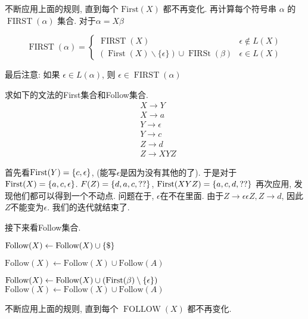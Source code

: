 \documentclass{ctexart}
\newcommand\first{\text{First}}
\newcommand\follow{\text{Follow}}
\begin{document}
    不断应用上面的规则, 直到每个 $\first(X)$ 都不再变化. 再计算每个符号串 $\alpha$ 的 $\operatorname{FIRST}(\alpha)$ 集合. 对于$\alpha=X \beta$

    $$
    \operatorname{FIRST}(\alpha)= \begin{cases}\operatorname{FIRST}(X) & \epsilon \notin L(X) \\ (\operatorname{First}(X) \backslash\{\epsilon\}) \cup \operatorname{FIRSt}(\beta) & \epsilon \in L(X)\end{cases}
    $$

    最后注意: 如果 $\epsilon \in L(\alpha)$, 则 $\epsilon \in \operatorname{FIRST}(\alpha)$

    \begin{example}
        求如下的文法的First集合和Follow集合. 
        $$
\begin{aligned}
& X \rightarrow Y \\
& X \rightarrow a \\
& Y \rightarrow \epsilon \\
& Y \rightarrow c \\
& Z \rightarrow d \\
& Z \rightarrow X Y Z
\end{aligned}
$$

首先看$\first(Y)=\set{c, \epsilon}$, (能写$\epsilon$是因为没有其他的了). 于是对于$\first(X)=\set{a, c, \epsilon}$. $F(Z)=\{d,a,c, ??\}$, $\first(XYZ)=\set{a,c,d, ??}$ 再次应用, 发现他们都可以得到一个不动点. 问题在于, $\epsilon$在不在里面. 由于$Z\to \epsilon \epsilon Z, Z\to d$, 因此$Z$不能变为$\epsilon$. 我们的迭代就结束了. 
    \end{example}

    接下来看Follow集合. 

    \begin{algorithm}[H]
        \begin{algorithmic}[1]

              
              \State $\follow(X) \gets \follow(X) \cup \set{\$}$
            \EndFor


             
              \State $\follow(X) \gets \follow(X) \cup \follow(A)$
            \EndFor
        


             
              \State $\follow(X) \gets \follow(X) \cup (\first(\beta) \setminus \set{\epsilon})$
              \If{\red{$\epsilon \in \first(\beta)$}}
                \State $\follow(X) \gets \follow(X) \cup \follow(A)$
              \EndIf
            \EndFor
          \EndProcedure
        \end{algorithmic}
        \end{algorithm}
        不断应用上面的规则, 直到每个 $\operatorname{FOLLOW}(X)$ 都不再变化. 
\end{document}
